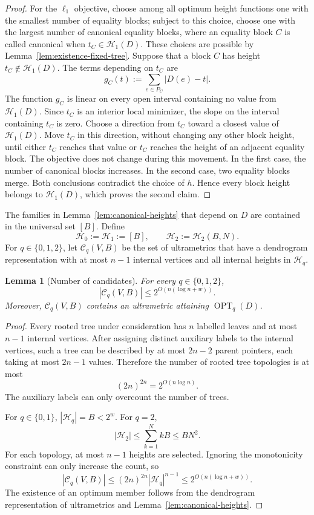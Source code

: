 \documentclass[11pt]{article}
\newtheorem{lemma}[theorem]{Lemma}
\theoremstyle{definition}
\newcommand{\cH}{\mathcal{H}}
\newcommand{\OPT}{\operatorname{OPT}}
\begin{document}
\begin{proof}
For the \(\ell_1\) objective, choose among all optimum height functions one
with the smallest number of equality blocks; subject to this choice, choose
one with the largest number of canonical equality blocks, where an equality
block \(C\) is called canonical when \(t_C\in\cH_1(D)\).  These choices are
possible by Lemma~\ref{lem:existence-fixed-tree}.  Suppose that a block \(C\)
has height
\(t_C\notin\cH_1(D)\).  The terms depending on \(t_C\) are
\[
 g_C(t):=\sum_{e\in P_C}|D(e)-t|.
\]
The function \(g_C\) is linear on every open interval containing no value
from \(\cH_1(D)\).  Since \(t_C\) is an interior local minimizer, the slope on
the interval containing \(t_C\) is zero.  Choose a direction from \(t_C\)
toward a closest value of \(\cH_1(D)\).  Move \(t_C\) in this direction,
without changing any other block height, until either \(t_C\) reaches that
value or \(t_C\) reaches the height of an adjacent equality block.
The objective does not change during this movement.  In the first case, the
number of canonical blocks increases.  In the second case, two equality
blocks merge.  Both conclusions contradict the choice of \(h\).  Hence every
block height belongs to \(\cH_1(D)\), which proves the second claim.
\end{proof}

The families in Lemma~\ref{lem:canonical-heights} that depend on \(D\) are
contained in the universal set \([B]\).  Define
\[
 \cH_0:=\cH_1:=[B],
 \qquad
 \cH_2:=\cH_2(B,N).
\]
For \(q\in\{0,1,2\}\), let \(\mathcal C_q(V,B)\) be the set of ultrametrics
that have a dendrogram representation with at most \(n-1\) internal vertices
and all internal heights in \(\cH_q\).

\begin{lemma}[Number of candidates]\label{lem:candidate-count}
For every \(q\in\{0,1,2\}\),
\[
 |\mathcal C_q(V,B)|
 \le 2^{O(n(\log n+w))}.
\]
Moreover, \(\mathcal C_q(V,B)\) contains an ultrametric attaining
\(\OPT_q(D)\).
\end{lemma}

\begin{proof}
Every rooted tree under consideration has \(n\) labelled leaves and at most
\(n-1\) internal vertices.  After assigning distinct auxiliary labels to the
internal vertices, such a tree can be described by at most \(2n-2\) parent
pointers, each taking at most \(2n-1\) values.  Therefore the number of rooted
tree topologies is at most
\[
 (2n)^{2n}=2^{O(n\log n)}.
\]
The auxiliary labels can only overcount the number of trees.

For \(q\in\{0,1\}\), \( |\cH_q|=B<2^w\).  For \(q=2\),
\[
 |\cH_2|
 \le\sum_{k=1}^N kB
 \le BN^2.
\]
For each topology, at most \(n-1\) heights are selected.  Ignoring the
monotonicity constraint can only increase the count, so
\[
 |\mathcal C_q(V,B)|
 \le (2n)^{2n}|\cH_q|^{n-1}
 \le 2^{O(n(\log n+w))}.
\]
The existence of an optimum member follows from the dendrogram
representation of ultrametrics and Lemma~\ref{lem:canonical-heights}.
\end{proof}
\end{document}
